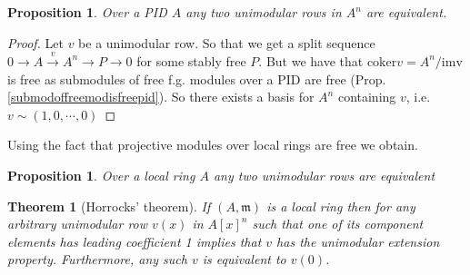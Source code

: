 \documentclass[12pt]{article}
\numberwithin{equation}{section}
\newcommand{\coker}{{\mathrm{coker}}}
\newcounter{dummy} \numberwithin{dummy}{section}
\newtheorem{theorem}[dummy]{Theorem}
\newtheorem{proposition}[dummy]{Proposition}
\begin{document}
	\begin{proposition}\label{inductionbaseforprequillensuslin}
		Over a PID $A$ any two unimodular rows in $A^n$ are equivalent.
	\end{proposition}
	\begin{proof}
		Let $v $ be a unimodular row. So that we get a split sequence $0 \to A \xrightarrow{v} A^n \to P \to 0 $ for some stably free $P$. But we have that $\coker v = A^n/\mathrm{im v} $ is free as submodules of free f.g. modules over a PID are free (Prop. \ref{submodoffreemodisfreepid}). So there exists a basis for $A^n$ containing $v$, i.e. $v \sim (1,0,\cdots,0)$

	\end{proof}
	Using the fact that projective modules over local rings are free we obtain.
	\begin{proposition}
		Over a local ring $A$ any two unimodular rows are equivalent
	\end{proposition}
	\begin{theorem}[Horrocks' theorem]
	If $(A, \mathfrak{m})$ is a local ring then for any arbitrary unimodular row $v(x)$ in $A[x]^n$ such that one of its component elements has leading coefficient 1 implies that $v$ has the unimodular extension property. Furthermore, any such $v$ is equivalent to $v(0)$.
	\end{theorem}
\end{document}
